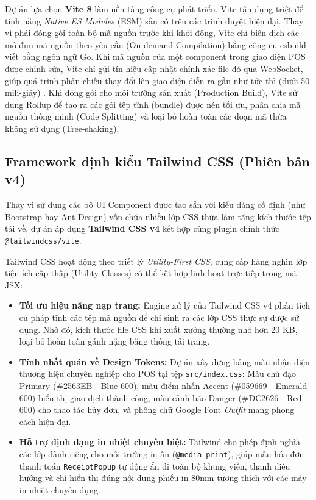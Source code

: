 Dự án lựa chọn \textbf{Vite 8} làm nền tảng công cụ phát triển. Vite tận dụng triệt để tính năng \textit{Native ES Modules} (ESM) sẵn có trên các trình duyệt hiện đại. Thay vì phải đóng gói toàn bộ mã nguồn trước khi khởi động, Vite chỉ biên dịch các mô-đun mã nguồn theo yêu cầu (On-demand Compilation) bằng công cụ esbuild viết bằng ngôn ngữ Go. Khi mã nguồn của một component trong giao diện POS được chỉnh sửa, Vite chỉ gửi tín hiệu cập nhật chính xác file đó qua WebSocket, giúp quá trình phản chiếu thay đổi lên giao diện diễn ra gần như tức thì (dưới 50 mili-giây) \cite{vitedoc2024}. Khi đóng gói cho môi trường sản xuất (Production Build), Vite sử dụng Rollup để tạo ra các gói tệp tĩnh (bundle) được nén tối ưu, phân chia mã nguồn thông minh (Code Splitting) và loại bỏ hoàn toàn các đoạn mã thừa không sử dụng (Tree-shaking).

\subsection{Framework định kiểu Tailwind CSS (Phiên bản v4)}
Thay vì sử dụng các bộ UI Component được tạo sẵn với kiểu dáng cố định (như Bootstrap hay Ant Design) vốn chứa nhiều lớp CSS thừa làm tăng kích thước tệp tải về, dự án áp dụng \textbf{Tailwind CSS v4} kết hợp cùng plugin chính thức \texttt{@tailwindcss/vite}.

Tailwind CSS hoạt động theo triết lý \textit{Utility-First CSS}, cung cấp hàng nghìn lớp tiện ích cấp thấp (Utility Classes) có thể kết hợp linh hoạt trực tiếp trong mã JSX:
\begin{itemize}[leftmargin=1.5cm]
    \item \textbf{Tối ưu hiệu năng nạp trang:} Engine xử lý của Tailwind CSS v4 phân tích cú pháp tĩnh các tệp mã nguồn để chỉ sinh ra các lớp CSS thực sự được sử dụng. Nhờ đó, kích thước file CSS khi xuất xưởng thường nhỏ hơn $20$ KB, loại bỏ hoàn toàn gánh nặng băng thông tải trang.
    \item \textbf{Tính nhất quán về Design Tokens:} Dự án xây dựng bảng màu nhận diện thương hiệu chuyên nghiệp cho POS tại tệp \texttt{src/index.css}: Màu chủ đạo Primary (\#2563EB - Blue 600), màu điểm nhấn Accent (\#059669 - Emerald 600) biểu thị giao dịch thành công, màu cảnh báo Danger (\#DC2626 - Red 600) cho thao tác hủy đơn, và phông chữ Google Font \textit{Outfit} mang phong cách hiện đại.
    \item \textbf{Hỗ trợ định dạng in nhiệt chuyên biệt:} Tailwind cho phép định nghĩa các lớp dành riêng cho môi trường in ấn (\texttt{@media print}), giúp mẫu hóa đơn thanh toán \texttt{ReceiptPopup} tự động ẩn đi toàn bộ khung viền, thanh điều hướng và chỉ hiển thị đúng nội dung phiếu in 80mm tương thích với các máy in nhiệt chuyên dụng.
\end{itemize}

